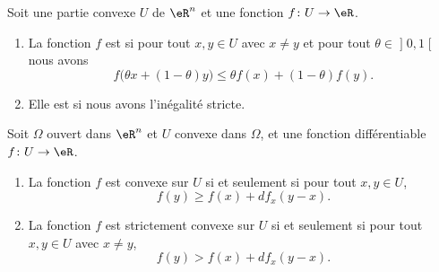 \begin{definition}
    Soit une partie convexe \( U\) de \( \eR^n\) et une fonction \( f\colon U\to \eR\). 
    \begin{enumerate}
        \item
        La fonction \( f\) est  si pour tout \( x,y\in U\) avec \( x\neq y\) et pour tout \( \theta\in\mathopen] 0 , 1 \mathclose[\) nous avons
            \begin{equation}
                f\big( \theta x+(1-\theta)y \big)\leq \theta f(x)+(1-\theta)f(y).
            \end{equation}
        \item
            Elle est  si nous avons l'inégalité stricte.
    \end{enumerate}
\end{definition}

\begin{proposition}      \label{PROPooYNNHooSHLvHp}
    Soit \( \Omega\) ouvert dans \( \eR^n\) et \( U\) convexe dans \( \Omega\), et une fonction différentiable \( f\colon U\to \eR\).
    \begin{enumerate}
        \item       \label{ITEMooRVIVooIayuPS}
            La fonction \( f\) est convexe sur \( U\) si et seulement si pour tout \( x,y\in U\),
            \begin{equation}
                f(y)\geq f(x)+df_x(y-x).
            \end{equation}
        \item       \label{ITEMooCWEWooFtNnKl}
            La fonction \( f\) est strictement convexe sur \( U\) si et seulement si pour tout \( x,y\in U\) avec \( x\neq y\),
            \begin{equation}
                f(y)>f(x)+df_x(y-x).
            \end{equation}
    \end{enumerate}
\end{proposition}

